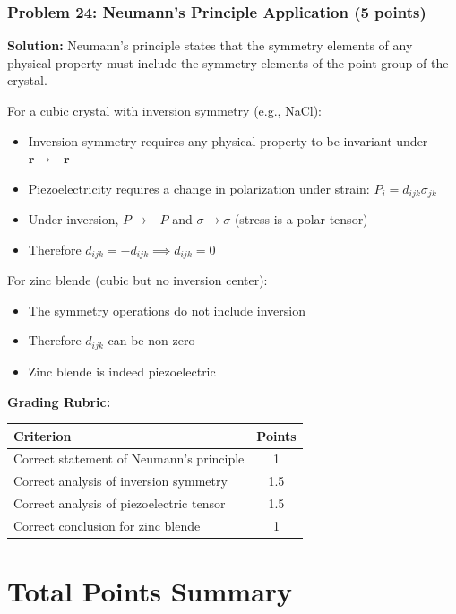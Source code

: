 \documentclass[12pt,a4paper]{article}
\begin{document}
\subsubsection*{Problem 24: Neumann's Principle Application (5 points)}
\textbf{Solution:}
Neumann's principle states that the symmetry elements of any physical property must include the symmetry elements of the point group of the crystal.

For a cubic crystal with inversion symmetry (e.g., NaCl):
\begin{itemize}
    \item Inversion symmetry requires any physical property to be invariant under $\mathbf{r} \rightarrow -\mathbf{r}$
    \item Piezoelectricity requires a change in polarization under strain: $P_i = d_{ijk}\sigma_{jk}$
    \item Under inversion, $P \rightarrow -P$ and $\sigma \rightarrow \sigma$ (stress is a polar tensor)
    \item Therefore $d_{ijk} = -d_{ijk} \implies d_{ijk} = 0$
\end{itemize}

For zinc blende (cubic but no inversion center):
\begin{itemize}
    \item The symmetry operations do not include inversion
    \item Therefore $d_{ijk}$ can be non-zero
    \item Zinc blende is indeed piezoelectric
\end{itemize}

\textbf{Grading Rubric:}
\begin{table}[h]
\centering
\begin{tabular}{|p{10cm}|c|}
\hline
\textbf{Criterion} & \textbf{Points} \\
\hline
Correct statement of Neumann's principle & 1 \\
Correct analysis of inversion symmetry & 1.5 \\
Correct analysis of piezoelectric tensor & 1.5 \\
Correct conclusion for zinc blende & 1 \\
\hline
\end{tabular}
\end{table}

\section{Total Points Summary}
\end{document}
